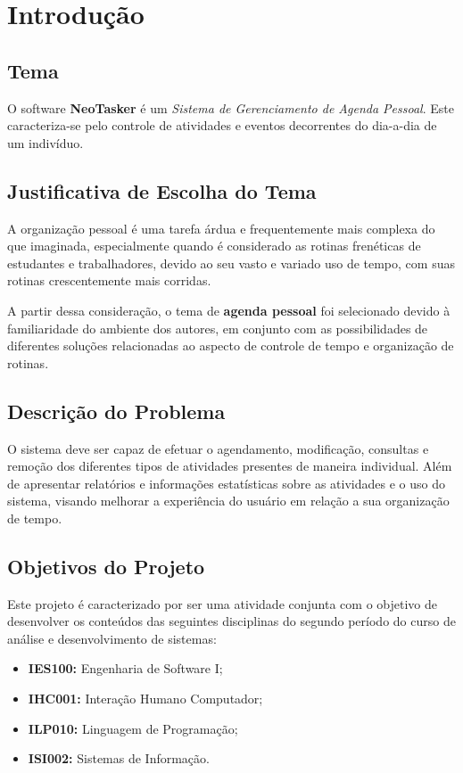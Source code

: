 \documentclass[a4paper,12pt]{article}
\begin{document}
\setcounter{tocdepth}{4}
\tableofcontents
\pagebreak

\listoffigures
\pagebreak

\section{Introdução}
\subsection{Tema}
O software \textbf{NeoTasker} é um \textit{Sistema de Gerenciamento de Agenda Pessoal}. Este caracteriza-se pelo controle de atividades e eventos decorrentes do dia-a-dia de um indivíduo.

\subsection{Justificativa de Escolha do Tema}
A organização pessoal é uma tarefa árdua e frequentemente mais complexa do que imaginada, especialmente quando é considerado as rotinas frenéticas de estudantes e trabalhadores, devido ao seu vasto e variado uso de tempo, com suas rotinas crescentemente mais corridas.

A partir dessa consideração, o tema de \textbf{agenda pessoal} foi selecionado devido à familiaridade do ambiente dos autores, em conjunto com as possibilidades de diferentes soluções relacionadas ao aspecto de controle de tempo e organização de rotinas.

\subsection{Descrição do Problema}
O sistema deve ser capaz de efetuar o agendamento, modificação, consultas e remoção dos diferentes tipos de atividades presentes de maneira individual. Além de apresentar relatórios e informações estatísticas sobre as atividades e o uso do sistema, visando melhorar a experiência do usuário em relação a sua organização de tempo.

\subsection{Objetivos do Projeto}
Este projeto é caracterizado por ser uma atividade conjunta com o objetivo de desenvolver os conteúdos das seguintes disciplinas do segundo período do curso de análise e desenvolvimento de sistemas:
\begin{itemize}
    \item \textbf{IES100:} Engenharia de Software I;
    \item \textbf{IHC001:} Interação Humano Computador;
    \item \textbf{ILP010:} Linguagem de Programação;
    \item \textbf{ISI002:} Sistemas de Informação.
\end{itemize}
\end{document}
